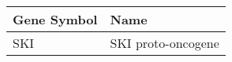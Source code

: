 \begin{tabular}{ll}
\toprule
Gene Symbol &               Name \\
\midrule
        SKI & SKI proto-oncogene \\
\bottomrule
\end{tabular}
